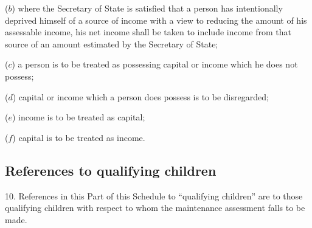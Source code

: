 \documentclass[12pt,a4paper]{article}
\begin{document}
{\begin{enumerate}
($b$) where the Secretary of State is satisfied that a person has intentionally deprived himself of a source of income with a view to reducing the amount of his assessable income, his net income shall be taken to include income from that source of an amount estimated by the Secretary of State;

($c$) a person is to be treated as possessing capital or income which he does not possess;

($d$) capital or income which a person does possess is to be disregarded;

($e$) income is to be treated as capital;

($f$) capital is to be treated as income.
\end{enumerate}


\subsection*{References to qualifying children}

10. References in this Part of this Schedule to “qualifying children” are to those qualifying children with respect to whom the maintenance assessment falls to be made.

}
\end{document}
